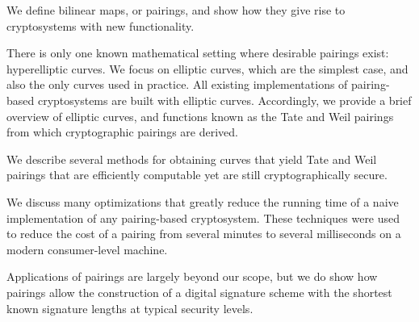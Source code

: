 
We define bilinear maps, or pairings, and show how they
give rise to cryptosystems with new functionality.

There is only one known mathematical setting where desirable
pairings exist: hyperelliptic curves. We focus on elliptic curves,
which are the simplest case, and also the only curves used in practice.
All existing implementations of pairing-based cryptosystems are built
with elliptic curves. Accordingly,
we provide a brief overview of elliptic curves, and functions known as
the Tate and Weil pairings from which cryptographic pairings are derived.

We describe several methods for obtaining curves that yield Tate and Weil
pairings that are efficiently computable yet are still cryptographically
secure.

We discuss many optimizations that greatly reduce the running time
of a naive implementation of any pairing-based cryptosystem. These
techniques were used to reduce the
cost of a pairing from several minutes
to several milliseconds on a modern consumer-level machine.

Applications of pairings are largely beyond our scope, but we
do show how pairings allow the construction of a digital signature scheme
with the shortest known signature lengths at typical security levels.
